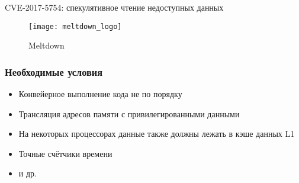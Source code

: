 \begin{frame}{\insertsubsection}

  CVE-2017-5754: спекулятивное чтение недоступных данных

  \begin{figure}[h]
    \texttt{[image: meltdown\_logo]}
    \caption{Meltdown}
  \end{figure}

  \note{


  }
\end{frame}

\subsubsection{Необходимые условия}
\begin{frame}{\insertsubsubsection}
  \begin{itemize}
  \item Конвейерное выполнение кода не по порядку
  \item Трансляция адресов памяти с привилегированными данными
  \item На некоторых процессорах данные также должны лежать в кэше данных L1
  \item Точные счётчики времени
  \item и др.
  \end{itemize}

\end{frame}


